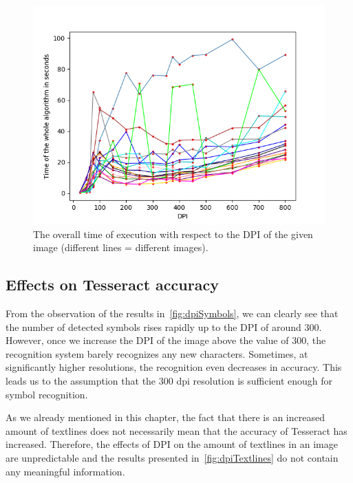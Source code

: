 \begin{figure}[t]
    \includegraphics[width=\linewidth]{img/results/dpiTimeAll.png}
    \caption{The overall time of execution with respect to the DPI of the given image (different lines = different images).}
    \label{fig:dpiAllTime}
\endminipage
\label{resultsDPITime}
\end{figure}

\subsection{Effects on Tesseract accuracy}

From the observation of the results in~\cref{fig:dpiSymbols}, we can clearly see that the number of detected symbols rises rapidly up to the DPI of around 300. However, once we increase the DPI of the image above the value of 300, the recognition system barely recognizes any new characters. Sometimes, at significantly higher resolutions, the recognition even decreases in accuracy. This leads us to the assumption that the 300 dpi resolution is sufficient enough for symbol recognition.

As we already mentioned in this chapter, the fact that there is an increased amount of textlines does not necessarily mean that the accuracy of Tesseract has increased. Therefore, the effects of DPI on the amount of textlines in an image are unpredictable and the results presented in~\cref{fig:dpiTextlines} do not contain any meaningful information.

